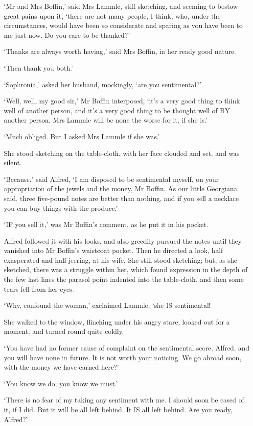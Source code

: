 ‘Mr and Mrs Boffin,’ said Mrs Lammle, still sketching, and seeming to
bestow great pains upon it, ‘there are not many people, I think, who,
under the circumstances, would have been so considerate and sparing as
you have been to me just now. Do you care to be thanked?’

‘Thanks are always worth having,’ said Mrs Boffin, in her ready good
nature.

‘Then thank you both.’

‘Sophronia,’ asked her husband, mockingly, ‘are you sentimental?’

‘Well, well, my good sir,’ Mr Boffin interposed, ‘it’s a very good
thing to think well of another person, and it’s a very good thing to be
thought well of BY another person. Mrs Lammle will be none the worse for
it, if she is.’

‘Much obliged. But I asked Mrs Lammle if she was.’

She stood sketching on the table-cloth, with her face clouded and set,
and was silent.

‘Because,’ said Alfred, ‘I am disposed to be sentimental myself, on
your appropriation of the jewels and the money, Mr Boffin. As our little
Georgiana said, three five-pound notes are better than nothing, and if
you sell a necklace you can buy things with the produce.’

‘IF you sell it,’ was Mr Boffin’s comment, as he put it in his pocket.

Alfred followed it with his looks, and also greedily pursued the notes
until they vanished into Mr Boffin’s waistcoat pocket. Then he directed
a look, half exasperated and half jeering, at his wife. She still stood
sketching; but, as she sketched, there was a struggle within her, which
found expression in the depth of the few last lines the parasol point
indented into the table-cloth, and then some tears fell from her eyes.

‘Why, confound the woman,’ exclaimed Lammle, ‘she IS sentimental!

She walked to the window, flinching under his angry stare, looked out
for a moment, and turned round quite coldly.

‘You have had no former cause of complaint on the sentimental score,
Alfred, and you will have none in future. It is not worth your noticing.
We go abroad soon, with the money we have earned here?’

‘You know we do; you know we must.’

‘There is no fear of my taking any sentiment with me. I should soon be
eased of it, if I did. But it will be all left behind. It IS all left
behind. Are you ready, Alfred?’

